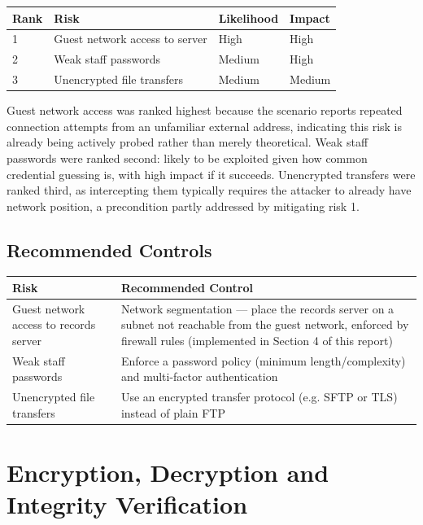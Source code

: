 \documentclass[11pt]{article}
\begin{document}
\begin{center}
\begin{tabular}{@{}llll@{}}
\toprule
Rank & Risk & Likelihood & Impact \\
\midrule
1 & Guest network access to server & High & High \\
2 & Weak staff passwords & Medium & High \\
3 & Unencrypted file transfers & Medium & Medium \\
\bottomrule
\end{tabular}
\end{center}

Guest network access was ranked highest because the scenario reports repeated connection
attempts from an unfamiliar external address, indicating this risk is already being actively
probed rather than merely theoretical. Weak staff passwords were ranked second: likely to be
exploited given how common credential guessing is, with high impact if it succeeds. Unencrypted
transfers were ranked third, as intercepting them typically requires the attacker to already
have network position, a precondition partly addressed by mitigating risk 1.

\subsection{Recommended Controls}

\begin{center}
\begin{tabular}{@{}p{5.5cm}p{7.5cm}@{}}
\toprule
Risk & Recommended Control \\
\midrule
Guest network access to records server & Network segmentation — place the records server on a subnet not reachable from the guest network, enforced by firewall rules (implemented in Section 4 of this report) \\
Weak staff passwords & Enforce a password policy (minimum length/complexity) and multi-factor authentication \\
Unencrypted file transfers & Use an encrypted transfer protocol (e.g. SFTP or TLS) instead of plain FTP \\
\bottomrule
\end{tabular}
\end{center}

\section{Encryption, Decryption and Integrity Verification}
\end{document}
